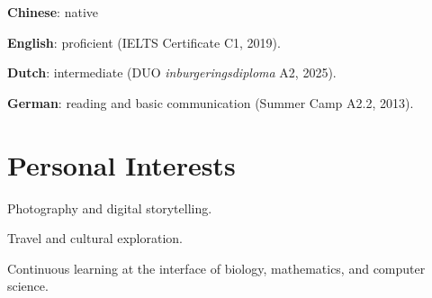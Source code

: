 \begin{expitem}
  \item \textbf{Chinese}: native
  \item \textbf{English}: proficient (IELTS Certificate C1, 2019).
  \item \textbf{Dutch}: intermediate (DUO \emph{inburgeringsdiploma} A2, 2025).
  \item \textbf{German}: reading and basic communication (Summer Camp A2.2, 2013).
\end{expitem}

\section*{Personal Interests}

\begin{expitem}
  \item Photography and digital storytelling.
  \item Travel and cultural exploration.
  \item Continuous learning at the interface of biology, mathematics, and computer science.
\end{expitem}

